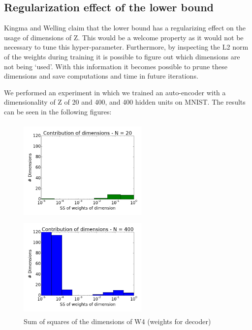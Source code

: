 \documentclass{article}
\begin{document}
\subsection{Regularization effect of the lower bound}
Kingma and Welling \cite{kingma2013auto} claim that the lower bound has a regularizing effect on the usage of dimensions of Z. This would be a welcome property as it would not be necessary to tune this hyper-parameter. Furthermore, by inspecting the L2 norm of the weights during training it is possible to figure out which dimensions are not being `used'. With this information it becomes possible to prune these dimensions and save computations and time in future iterations.

We performed an experiment in which we trained an auto-encoder with a dimensionality of Z of 20 and 400, and 400 hidden units on MNIST. The results can be seen in the following figures:

\begin{figure}[htb]
    \centering
    \begin{minipage}{0.36\textwidth}
        \includegraphics[height=2in,width=2.5in]{relevant_z_N20.png}
    \end{minipage}
    \centering
    \begin{minipage}{0.36\textwidth}
        \includegraphics[height=2in,width=2.5in]{relevant_z_N400.png}
    \end{minipage}
    \caption{Sum of squares of the dimensions of W4 (weights for decoder)}
\end{figure}
\end{document}
